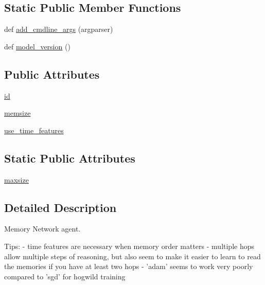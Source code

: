 \subsection*{Static Public Member Functions}
\begin{DoxyCompactItemize}
\item 
def \hyperlink{classparlai_1_1agents_1_1memnn_1_1memnn_1_1MemnnAgent_a25443d48c341d3f88a648c8273dfbf66}{add\+\_\+cmdline\+\_\+args} (argparser)
\item 
def \hyperlink{classparlai_1_1agents_1_1memnn_1_1memnn_1_1MemnnAgent_ae6e06364ccf919d70064d5966e5c1cf3}{model\+\_\+version} ()
\end{DoxyCompactItemize}
\subsection*{Public Attributes}
\begin{DoxyCompactItemize}
\item 
\hyperlink{classparlai_1_1agents_1_1memnn_1_1memnn_1_1MemnnAgent_ac313c81db957b095beb84fa7ef1c1286}{id}
\item 
\hyperlink{classparlai_1_1agents_1_1memnn_1_1memnn_1_1MemnnAgent_a73e14a945e200d85f239a6d1f08c8d54}{memsize}
\item 
\hyperlink{classparlai_1_1agents_1_1memnn_1_1memnn_1_1MemnnAgent_a259eb74db201a70a8f82f160860d7b88}{use\+\_\+time\+\_\+features}
\end{DoxyCompactItemize}
\subsection*{Static Public Attributes}
\begin{DoxyCompactItemize}
\item 
\hyperlink{classparlai_1_1agents_1_1memnn_1_1memnn_1_1MemnnAgent_aff26270b3e93fc2c0a69a184774ec55e}{maxsize}
\end{DoxyCompactItemize}


\subsection{Detailed Description}
\begin{DoxyVerb}Memory Network agent.

Tips:
- time features are necessary when memory order matters
- multiple hops allow multiple steps of reasoning, but also seem to make it
    easier to learn to read the memories if you have at least two hops
- 'adam' seems to work very poorly compared to 'sgd' for hogwild training
\end{DoxyVerb}
 

